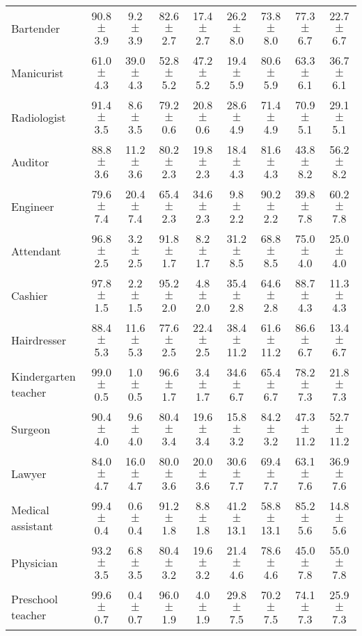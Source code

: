 \begin{table*}[p]
{\begin{tabular}{l|cc|cc|cc|cc}
Bartender
& 90.8 $\pm$ 3.9 & 9.2 $\pm$ 3.9
& 82.6 $\pm$ 2.7 & 17.4 $\pm$ 2.7
& 26.2 $\pm$ 8.0 & 73.8 $\pm$ 8.0
& 77.3 $\pm$ 6.7 & 22.7 $\pm$ 6.7
\\
Manicurist
& 61.0 $\pm$ 4.3 & 39.0 $\pm$ 4.3
& 52.8 $\pm$ 5.2 & 47.2 $\pm$ 5.2
& 19.4 $\pm$ 5.9 & 80.6 $\pm$ 5.9
& 63.3 $\pm$ 6.1 & 36.7 $\pm$ 6.1
\\
Radiologist
& 91.4 $\pm$ 3.5 & 8.6 $\pm$ 3.5
& 79.2 $\pm$ 0.6 & 20.8 $\pm$ 0.6
& 28.6 $\pm$ 4.9 & 71.4 $\pm$ 4.9
& 70.9 $\pm$ 5.1 & 29.1 $\pm$ 5.1
\\
Auditor
& 88.8 $\pm$ 3.6 & 11.2 $\pm$ 3.6
& 80.2 $\pm$ 2.3 & 19.8 $\pm$ 2.3
& 18.4 $\pm$ 4.3 & 81.6 $\pm$ 4.3
& 43.8 $\pm$ 8.2 & 56.2 $\pm$ 8.2
\\
Engineer
& 79.6 $\pm$ 7.4 & 20.4 $\pm$ 7.4
& 65.4 $\pm$ 2.3 & 34.6 $\pm$ 2.3
& 9.8 $\pm$ 2.2 & 90.2 $\pm$ 2.2
& 39.8 $\pm$ 7.8 & 60.2 $\pm$ 7.8
\\
Attendant
& 96.8 $\pm$ 2.5 & 3.2 $\pm$ 2.5
& 91.8 $\pm$ 1.7 & 8.2 $\pm$ 1.7
& 31.2 $\pm$ 8.5 & 68.8 $\pm$ 8.5
& 75.0 $\pm$ 4.0 & 25.0 $\pm$ 4.0
\\
Cashier
& 97.8 $\pm$ 1.5 & 2.2 $\pm$ 1.5
& 95.2 $\pm$ 2.0 & 4.8 $\pm$ 2.0
& 35.4 $\pm$ 2.8 & 64.6 $\pm$ 2.8
& 88.7 $\pm$ 4.3 & 11.3 $\pm$ 4.3
\\
Hairdresser
& 88.4 $\pm$ 5.3 & 11.6 $\pm$ 5.3
& 77.6 $\pm$ 2.5 & 22.4 $\pm$ 2.5
& 38.4 $\pm$ 11.2 & 61.6 $\pm$ 11.2
& 86.6 $\pm$ 6.7 & 13.4 $\pm$ 6.7
\\
Kindergarten teacher
& 99.0 $\pm$ 0.5 & 1.0 $\pm$ 0.5
& 96.6 $\pm$ 1.7 & 3.4 $\pm$ 1.7
& 34.6 $\pm$ 6.7 & 65.4 $\pm$ 6.7
& 78.2 $\pm$ 7.3 & 21.8 $\pm$ 7.3
\\
Surgeon
& 90.4 $\pm$ 4.0 & 9.6 $\pm$ 4.0
& 80.4 $\pm$ 3.4 & 19.6 $\pm$ 3.4
& 15.8 $\pm$ 3.2 & 84.2 $\pm$ 3.2
& 47.3 $\pm$ 11.2 & 52.7 $\pm$ 11.2
\\
Lawyer
& 84.0 $\pm$ 4.7 & 16.0 $\pm$ 4.7
& 80.0 $\pm$ 3.6 & 20.0 $\pm$ 3.6
& 30.6 $\pm$ 7.7 & 69.4 $\pm$ 7.7
& 63.1 $\pm$ 7.6 & 36.9 $\pm$ 7.6
\\
Medical assistant
& 99.4 $\pm$ 0.4 & 0.6 $\pm$ 0.4
& 91.2 $\pm$ 1.8 & 8.8 $\pm$ 1.8
& 41.2 $\pm$ 13.1 & 58.8 $\pm$ 13.1
& 85.2 $\pm$ 5.6 & 14.8 $\pm$ 5.6
\\
Physician
& 93.2 $\pm$ 3.5 & 6.8 $\pm$ 3.5
& 80.4 $\pm$ 3.2 & 19.6 $\pm$ 3.2
& 21.4 $\pm$ 4.6 & 78.6 $\pm$ 4.6
& 45.0 $\pm$ 7.8 & 55.0 $\pm$ 7.8
\\
Preschool teacher
& 99.6 $\pm$ 0.7 & 0.4 $\pm$ 0.7
& 96.0 $\pm$ 1.9 & 4.0 $\pm$ 1.9
& 29.8 $\pm$ 7.5 & 70.2 $\pm$ 7.5
& 74.1 $\pm$ 7.3 & 25.9 $\pm$ 7.3

\end{tabular}}
\end{table*}
